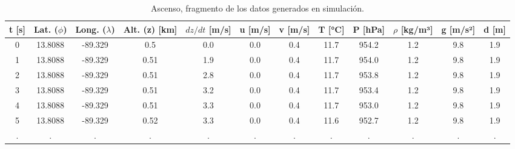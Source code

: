 \begin{table}
\small
\centering
\caption{Ascenso, fragmento de los datos generados en simulación.}
\label{tab:ascenso_frag_datos_generados}
\begin{tabular}{cccccccccccc}
\toprule
\textbf{t [s]} & \textbf{Lat. ($\phi$)} & \textbf{Long. ($\lambda$)} & \textbf{Alt. (z) [km]} & \textbf{$dz/dt$ [m/s]} & \textbf{u [m/s]} & \textbf{v [m/s]} & \textbf{T [°C]} & \textbf{P [hPa]} & \textbf{$\rho$ [kg/m³]} & \textbf{g [m/s²]} & \textbf{d [m]} \\
\midrule
             0 &                13.8088 &                    -89.329 &                    0.5 &                    0.0 &              0.0 &              0.4 &            11.7 &            954.2 &                     1.2 &               9.8 &            1.9 \\
             1 &                13.8088 &                    -89.329 &                   0.51 &                    1.9 &              0.0 &              0.4 &            11.7 &            954.0 &                     1.2 &               9.8 &            1.9 \\
             2 &                13.8088 &                    -89.329 &                   0.51 &                    2.8 &              0.0 &              0.4 &            11.7 &            953.8 &                     1.2 &               9.8 &            1.9 \\
             3 &                13.8088 &                    -89.329 &                   0.51 &                    3.2 &              0.0 &              0.4 &            11.7 &            953.4 &                     1.2 &               9.8 &            1.9 \\
             4 &                13.8088 &                    -89.329 &                   0.51 &                    3.3 &              0.0 &              0.4 &            11.7 &            953.0 &                     1.2 &               9.8 &            1.9 \\
             5 &                13.8088 &                    -89.329 &                   0.52 &                    3.3 &              0.0 &              0.4 &            11.6 &            952.7 &                     1.2 &               9.8 &            1.9 \\
             . &                      . &                          . &                      . &                      . &                . &                . &               . &                . &                       . &                 . &              . \\

\end{tabular}
\end{table}
